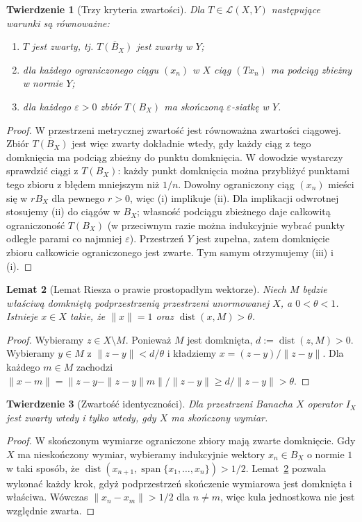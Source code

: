 \documentclass[11pt,a4paper]{article}
\numberwithin{equation}{section}
\theoremstyle{plain}
\newtheorem{twierdzenie}{Twierdzenie}[section]
\newtheorem{lemat}[twierdzenie]{Lemat}
\theoremstyle{definition}
\theoremstyle{remark}
\begin{document}
\begin{twierdzenie}[Trzy kryteria zwartości]
\label{thm:compact-criteria29}
Dla $T\in\mathcal L(X,Y)$ następujące warunki są równoważne:
\begin{enumerate}[label=\textup{(\roman*)}]
\item $T$ jest zwarty, tj. $\overline{T(B_X)}$ jest zwarty w $Y$;
\item dla każdego ograniczonego ciągu $(x_n)$ w $X$ ciąg $(Tx_n)$
      ma podciąg zbieżny w normie $Y$;
\item dla każdego $\varepsilon>0$ zbiór $T(B_X)$ ma skończoną
      $\varepsilon$-siatkę w $Y$.
\end{enumerate}
\end{twierdzenie}
\begin{proof}
W przestrzeni metrycznej zwartość jest równoważna zwartości ciągowej.
Zbiór $\overline{T(B_X)}$ jest więc zwarty dokładnie wtedy,
gdy każdy ciąg z tego domknięcia ma podciąg zbieżny do punktu
domknięcia. W dowodzie wystarczy sprawdzić ciągi z $T(B_X)$:
każdy punkt domknięcia można przybliżyć punktami tego zbioru
z błędem mniejszym niż $1/n$.
Dowolny ograniczony ciąg $(x_n)$ mieści się w $rB_X$ dla pewnego
$r>0$, więc (i) implikuje (ii). Dla implikacji odwrotnej stosujemy
(ii) do ciągów w $B_X$; własność podciągu zbieżnego daje całkowitą
ograniczoność $T(B_X)$ (w przeciwnym razie można indukcyjnie
wybrać punkty odległe parami co najmniej $\varepsilon$).
Przestrzeń $Y$ jest zupełna, zatem domknięcie zbioru całkowicie
ograniczonego jest zwarte. Tym samym otrzymujemy (iii) i (i).
\end{proof}

\begin{lemat}[Lemat Riesza o prawie prostopadłym wektorze]
\label{lem:riesz29}
Niech $M$ będzie właściwą domkniętą podprzestrzenią przestrzeni
unormowanej $X$, a $0<\theta<1$. Istnieje $x\in X$ takie, że
$\|x\|=1$ oraz $\operatorname{dist}(x,M)>\theta$.
\end{lemat}
\begin{proof}
Wybieramy $z\in X\setminus M$. Ponieważ $M$ jest domknięta,
$d:=\operatorname{dist}(z,M)>0$. Wybieramy $y\in M$ z
$\|z-y\|<d/\theta$ i kładziemy $x=(z-y)/\|z-y\|$.
Dla każdego $m\in M$ zachodzi
$\|x-m\|=\|z-y-\|z-y\|m\|/\|z-y\|\ge d/\|z-y\|>\theta$.
\end{proof}

\begin{twierdzenie}[Zwartość identyczności]
\label{thm:identity-compact29}
Dla przestrzeni Banacha $X$ operator $I_X$ jest zwarty wtedy
i tylko wtedy, gdy $X$ ma skończony wymiar.
\end{twierdzenie}
\begin{proof}
W skończonym wymiarze ograniczone zbiory mają zwarte domknięcie.
Gdy $X$ ma nieskończony wymiar, wybieramy indukcyjnie wektory
$x_n\in B_X$ o normie $1$ w taki sposób, że
$\operatorname{dist}(x_{n+1},\operatorname{span}\{x_1,\ldots,x_n\})>1/2$.
Lemat~\ref{lem:riesz29} pozwala wykonać każdy krok, gdyż
podprzestrzeń skończenie wymiarowa jest domknięta i właściwa.
Wówczas $\|x_n-x_m\|>1/2$ dla $n\ne m$, więc kula jednostkowa
nie jest względnie zwarta.
\end{proof}
\end{document}
